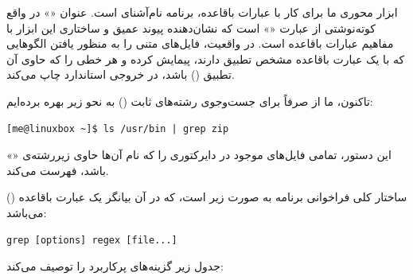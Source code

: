 ابزار محوری ما برای کار با عبارات باقاعده، برنامه نام‌آشنای  است. عنوان «» در واقع کوته‌نوشتی از عبارت «» است که نشان‌دهنده پیوند عمیق و ساختاری این ابزار با مفاهیم عبارات باقاعده است. در واقعیت،  فایل‌های متنی را به منظور یافتن الگوهایی که با یک عبارت باقاعده مشخص تطبیق دارند، پیمایش کرده و هر خطی را که حاوی آن تطبیق () باشد، در خروجی استاندارد چاپ می‌کند.

تاکنون، ما از  صرفاً برای جست‌وجوی رشته‌های ثابت () به نحو زیر بهره برده‌ایم:

\begin{latin}
\begin{lstlisting}
[me@linuxbox ~]$ ls /usr/bin | grep zip
\end{lstlisting}
\end{latin}

این دستور، تمامی فایل‌های موجود در دایرکتوری  را که نام آن‌ها حاوی زیررشته‌ی «» باشد، فهرست می‌کند.

ساختار کلی فراخوانی برنامه  به صورت زیر است، که در آن  بیانگر یک عبارت باقاعده () می‌باشد:

\begin{latin}
\begin{lstlisting}
grep [options] regex [file...]
\end{lstlisting}
\end{latin}

جدول زیر گزینه‌های پرکاربرد  را توصیف می‌کند:

